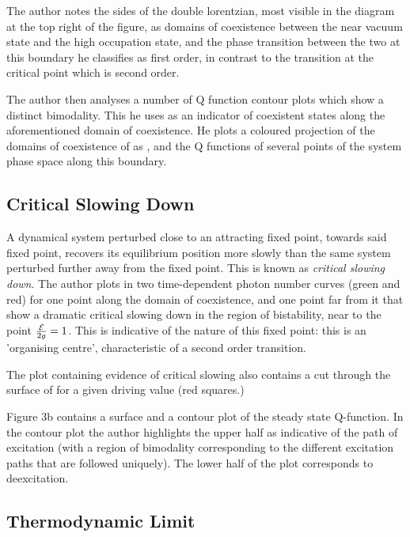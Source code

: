 The author notes the sides of the double lorentzian, most visible in the diagram at the top right of the figure, as domains of coexistence between the near vacuum state and the high occupation state, and the phase transition between the two at this boundary he classifies as first order, in contrast to the transition at the critical point which is second order.

The author then analyses a number of Q function contour plots which show a distinct bimodality. This he uses as an indicator of coexistent states along the aforementioned domain of coexistence. He plots a coloured projection of the domains of coexistence of \autocite[Figure 1 right hand side]{Carmichael2015} as \autocite[Figure 2]{Carmichael2015}, and the Q functions of several points of the system phase space along this boundary. 

\subsection{Critical Slowing Down}

A dynamical system perturbed close to an attracting fixed point, towards said fixed point, recovers its equilibrium position more slowly than the same system perturbed further away from the fixed point. This is known as \emph{critical slowing down}\autocite[40, 56]{Strogatz1994}. The author plots in \autocite[Figure 3]{Carmichael2015} two time-dependent photon number curves (green and red) for one point along the domain of coexistence, and one point far from it that show a dramatic critical slowing down in the region of bistability, near to the point $\frac{\mathcal{E}}{2g} = 1$. This is indicative of the nature of this fixed point: this is an 'organising centre', characteristic of a second order transition. 

The plot containing evidence of critical slowing also contains a cut through the surface of \autocite[Figure 2]{Carmichael2015} for a given driving value (red squares.)

Figure 3b contains a surface and a contour plot of the steady state Q-function. In the contour plot the author highlights the upper half as indicative of the path of excitation (with a region of bimodality corresponding to the different excitation paths that are followed uniquely). The lower half of the plot corresponds to deexcitation.

\subsection{Thermodynamic Limit}

